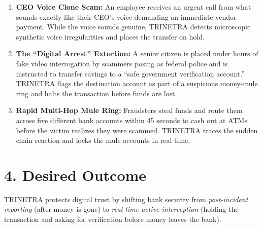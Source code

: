 \documentclass[11pt,a4paper]{article}
\begin{document}
\begin{enumerate}[leftmargin=*]
    \item \textbf{CEO Voice Clone Scam:} An employee receives an urgent call from what sounds exactly like their CEO's voice demanding an immediate vendor payment. While the voice sounds genuine, TRINETRA detects microscopic synthetic voice irregularities and places the transfer on hold.
    \item \textbf{The ``Digital Arrest'' Extortion:} A senior citizen is placed under hours of fake video interrogation by scammers posing as federal police and is instructed to transfer savings to a ``safe government verification account.'' TRINETRA flags the destination account as part of a suspicious money-mule ring and halts the transaction before funds are lost.
    \item \textbf{Rapid Multi-Hop Mule Ring:} Fraudsters steal funds and route them across five different bank accounts within 45 seconds to cash out at ATMs before the victim realizes they were scammed. TRINETRA traces the sudden chain reaction and locks the mule accounts in real time.
\end{enumerate}

\section*{4. Desired Outcome}
TRINETRA protects digital trust by shifting bank security from \textit{post-incident reporting} (after money is gone) to \textit{real-time active interception} (holding the transaction and asking for verification before money leaves the bank).
\end{document}
